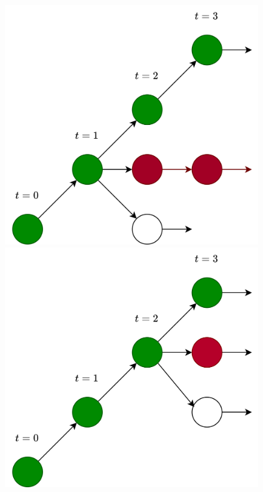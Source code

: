 \documentclass{article}
\begin{document}
\begin{figure}[h]
\begin{minipage}{0.3\textwidth}
\includegraphics[width=\textwidth]{images/t1mcts.png}
\end{minipage}
\hspace{0.03\textwidth}
\begin{minipage}{0.3\textwidth}
\vspace{-0.223\textwidth}
\includegraphics[width=\textwidth]{images/t2mcts.png}
\end{minipage}
\label{fig:mcts_tree}
\end{figure}
\end{document}
